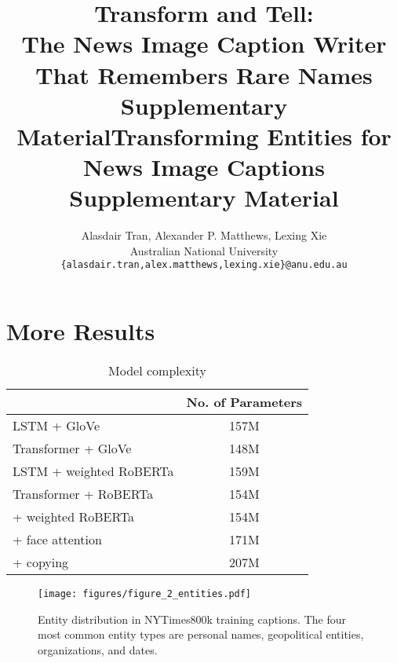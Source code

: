 \documentclass[10pt,twocolumn,letterpaper]{article}
\begin{document}
\title{Transform and Tell:\\The News Image Caption Writer That Remembers Rare Names\\Supplementary Material}
\title{Transforming Entities for News Image Captions\\Supplementary Material}

\author{Alasdair Tran, Alexander P. Matthews, Lexing Xie\\
Australian National University\\
{\tt\small \{alasdair.tran,alex.matthews,lexing.xie\}@anu.edu.au}
}

\maketitle

\section{More Results}

\begin{table}[t]
	\caption {Model complexity}
	\label{tab:models}
	\centering
	\begin{tabularx}{\linewidth}{Xc}
		\toprule
        & No. of Parameters \\
      \midrule
      LSTM + GloVe & 157M \\
      Transformer + GloVe & 148M \\
      LSTM + weighted RoBERTa & 159M \\
      \midrule
      Transformer + RoBERTa & 154M \\
      \quad + weighted RoBERTa & 154M \\
      \quad\quad + face attention & 171M \\
      \quad\quad\quad + copying & 207M \\
		\bottomrule
	\end{tabularx}
\end{table}

\begin{figure}[t]
   \begin{center}
   \texttt{[image: figures/figure\_2\_entities.pdf]}
   \end{center}
      \caption{Entity distribution in NYTimes800k training captions. The four
               most common entity types are personal names, geopolitical
               entities, organizations, and dates.}
   \label{fig:entities}
\end{figure}
\end{document}
